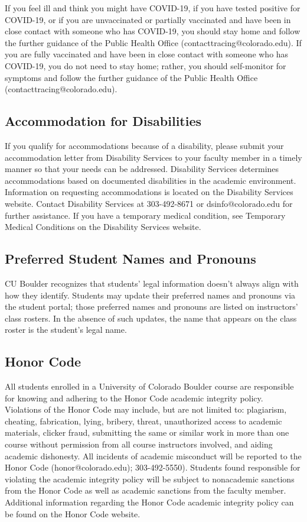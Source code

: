 \documentclass[9pt]{article}
\begin{document}
{ If you feel ill and think you might have COVID-19, if you have tested positive for COVID-19, or if you are unvaccinated or partially vaccinated and have been in close contact with someone who has COVID-19, you should stay home and follow the further guidance of the Public Health Office (contacttracing@colorado.edu). If you are fully vaccinated and have been in close contact with someone who has COVID-19, you do not need to stay home; rather, you should self-monitor for symptoms and follow the further guidance of the Public Health Office (contacttracing@colorado.edu).

 \subsection*{Accommodation for Disabilities}
If you qualify for accommodations because of a disability, please submit your accommodation letter from Disability Services to your faculty member in a timely manner so that your needs can be addressed.  Disability Services determines accommodations based on documented disabilities in the academic environment.  Information on requesting accommodations is located on the Disability Services website. Contact Disability Services at 303-492-8671 or dsinfo@colorado.edu for further assistance.  If you have a temporary medical condition, see Temporary Medical Conditions on the Disability Services website.

\subsection*{Preferred Student Names and Pronouns}
CU Boulder recognizes that students' legal information doesn't always align with how they identify. Students may update their preferred names and pronouns via the student portal; those preferred names and pronouns are listed on instructors' class rosters. In the absence of such updates, the name that appears on the class roster is the student's legal name.

\subsection*{Honor Code}
All students enrolled in a University of Colorado Boulder course are responsible for knowing and adhering to the Honor Code academic integrity policy. Violations of the Honor Code may include, but are not limited to: plagiarism, cheating, fabrication, lying, bribery, threat, unauthorized access to academic materials, clicker fraud, submitting the same or similar work in more than one course without permission from all course instructors involved, and aiding academic dishonesty. All incidents of academic misconduct will be reported to the Honor Code (honor@colorado.edu); 303-492-5550). Students found responsible for violating the academic integrity policy will be subject to nonacademic sanctions from the Honor Code as well as academic sanctions from the faculty member. Additional information regarding the Honor Code academic integrity policy can be found on the Honor Code website.

}
\end{document}
